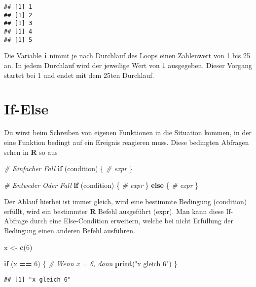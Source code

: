\documentclass[
]{book}
\newenvironment{Shaded}{\begin{snugshade}}{\end{snugshade}}
\newcommand{\CommentTok}[1]{\textcolor[rgb]{0.56,0.35,0.01}{\textit{#1}}}
\newcommand{\ControlFlowTok}[1]{\textcolor[rgb]{0.13,0.29,0.53}{\textbf{#1}}}
\newcommand{\DecValTok}[1]{\textcolor[rgb]{0.00,0.00,0.81}{#1}}
\newcommand{\KeywordTok}[1]{\textcolor[rgb]{0.13,0.29,0.53}{\textbf{#1}}}
\newcommand{\NormalTok}[1]{#1}
\newcommand{\OperatorTok}[1]{\textcolor[rgb]{0.81,0.36,0.00}{\textbf{#1}}}
\newcommand{\StringTok}[1]{\textcolor[rgb]{0.31,0.60,0.02}{#1}}
\begin{document}
\begin{verbatim}
## [1] 1
## [1] 2
## [1] 3
## [1] 4
## [1] 5
\end{verbatim}

Die Variable \texttt{i} nimmt je nach Durchlauf des Loops einen Zahlenwert von 1 bis 25 an. In jedem Durchlauf wird der jeweilige Wert von \texttt{i} ausgegeben. Dieser Vorgang startet bei 1 und endet mit dem 25ten Durchlauf.

\hypertarget{if-else}{%
\section{If-Else}\label{if-else}}

Du wirst beim Schreiben von eigenen Funktionen in die Situation kommen, in der eine Funktion bedingt auf ein Ereignis reagieren muss. Diese bedingten Abfragen sehen in \textbf{R} so aus

\begin{Shaded}
\begin{Highlighting}[]
\CommentTok{# Einfacher Fall}
  \ControlFlowTok{if}\NormalTok{ (condition) \{}
\CommentTok{# expr}
\NormalTok{\}}

\CommentTok{# Entweder Oder Fall}
\ControlFlowTok{if}\NormalTok{ (condition) \{}
  \CommentTok{# expr}
\NormalTok{\} }\ControlFlowTok{else}\NormalTok{ \{}
  \CommentTok{# expr}
\NormalTok{\}}
\end{Highlighting}
\end{Shaded}

Der Ablauf hierbei ist immer gleich, wird eine bestimmte Bedingung (condition) erfüllt, wird ein bestimmter \textbf{R} Befehl ausgeführt (expr).
Man kann diese If-Abfrage durch eine Else-Condition erweitern, welche bei nicht Erfüllung der Bedingung einen anderen Befehl ausführen.

\begin{Shaded}
\begin{Highlighting}[]
\NormalTok{x <-}\StringTok{ }\KeywordTok{c}\NormalTok{(}\DecValTok{6}\NormalTok{)}

\ControlFlowTok{if}\NormalTok{ (x }\OperatorTok{==}\StringTok{ }\DecValTok{6}\NormalTok{) \{ }\CommentTok{# Wenn x = 6, dann}
  \KeywordTok{print}\NormalTok{(}\StringTok{"x gleich 6"}\NormalTok{)}
\NormalTok{\}}
\end{Highlighting}
\end{Shaded}

\begin{verbatim}
## [1] "x gleich 6"
\end{verbatim}
\end{document}
